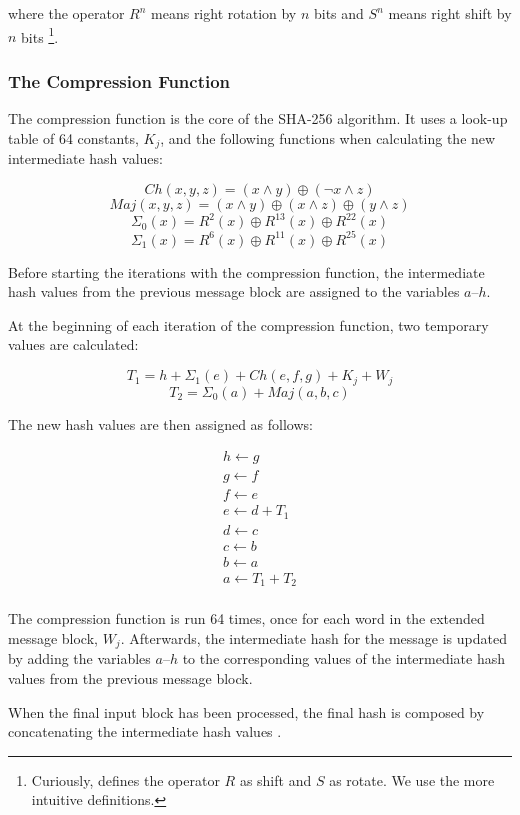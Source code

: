 \begin{appendix}
\noindent where the operator $R^n$ means right rotation by $n$ bits and $S^n$ means right shift by $n$
bits \footnote{Curiously, \cite{sha-spec} defines the operator $R$ as shift and $S$ as rotate.
We use the more intuitive definitions.}.

\subsubsection{The Compression Function}
\label{sec:sha-compr}
The compression function is the core of the SHA-256 algorithm. It uses a look-up table
of 64 constants, $K_j$, and the following functions when calculating the new intermediate
hash values:

\[Ch(x,y,z) = (x \wedge y) \oplus (\neg x \wedge z)\]
\[Maj(x, y, z) = (x \wedge y) \oplus (x \wedge z) \oplus (y \wedge z)\]
\[\Sigma_0(x) = R^2(x) \oplus R^{13}(x) \oplus R^{22}(x)\]
\[\Sigma_1(x) = R^6(x) \oplus R^{11}(x) \oplus R^{25}(x)\]

Before starting the iterations with the compression function, the intermediate
hash values from the previous message block are assigned to the variables $a$--$h$.

At the beginning of each iteration of the compression function, two temporary
values are calculated:

\[T_1 = h + \Sigma_1(e) + Ch(e, f, g) + K_j + W_j\]
\[T_2 = \Sigma_0(a) + Maj(a, b, c)\]

The new hash values are then assigned as follows:

\[\begin{array}{l}
	h \leftarrow g \\
	g \leftarrow f \\
	f \leftarrow e \\
	e \leftarrow d + T_1\\
	d \leftarrow c \\
	c \leftarrow b \\
	b \leftarrow a \\
	a \leftarrow T_1 + T_2 \\
\end{array}\]

The compression function is run 64 times, once for each word in the extended message block,
$W_j$. Afterwards, the intermediate hash for the message is updated by adding the
variables $a$--$h$ to the corresponding values of the intermediate hash values from
the previous message block.

When the final input block has been processed, the final hash is composed by
concatenating the intermediate hash values \cite{sha-spec} \cite{fordypningsprosjekt}.


\end{appendix}
